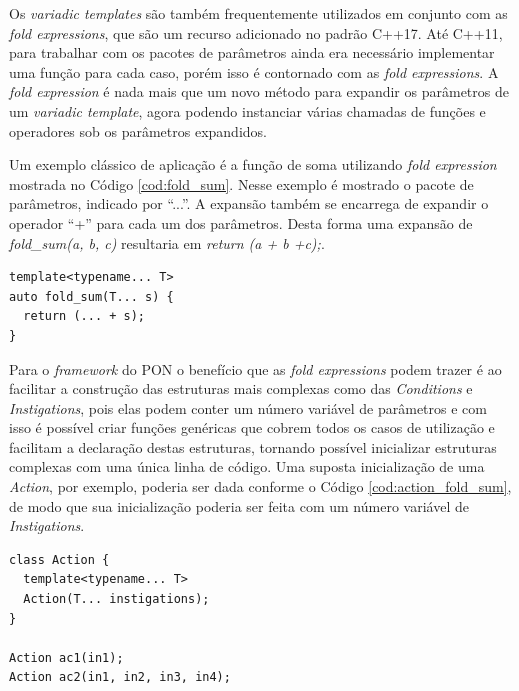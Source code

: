 Os \textit{variadic templates} são também frequentemente utilizados em conjunto
com as \textit{fold expressions}, que são um recurso adicionado no padrão C++17.
Até C++11, para trabalhar com os pacotes de parâmetros ainda era necessário
implementar uma função para cada caso, porém isso é contornado com as
\textit{fold expressions}. A \textit{fold expression} é nada mais que um novo
método para expandir os parâmetros de um \textit{variadic template}, agora
podendo instanciar várias chamadas de funções e operadores sob os parâmetros
expandidos.

Um exemplo clássico de aplicação é a função de soma utilizando \textit{fold
expression} mostrada no Código \ref{cod:fold_sum}. Nesse exemplo é mostrado o
pacote de parâmetros, indicado por \enquote{...}. A expansão também se encarrega
de expandir o operador \enquote{+} para cada um dos parâmetros. Desta forma uma
expansão de \textit{fold\_sum(a, b, c)} resultaria em \textit{return (a + b
+c);}.

\begin{lstlisting}[caption = {Uso de \textit{fold expressions}}, float=htb,
source = {Autoria própria},
label = {cod:fold_sum}]
template<typename... T>
auto fold_sum(T... s) {
  return (... + s);
}
\end{lstlisting}

\FloatBarrier

Para o \textit{framework} do PON o benefício que as \textit{fold expressions}
podem trazer é ao facilitar a construção das estruturas mais complexas como das
\textit{Conditions} e \textit{Instigations}, pois elas podem conter um número
variável de parâmetros e com isso é possível criar funções genéricas que cobrem
todos os casos de utilização e facilitam a declaração destas estruturas,
tornando possível inicializar estruturas complexas com uma única linha de
código. Uma suposta inicialização de uma \textit{Action}, por exemplo, poderia
ser dada conforme o Código \ref{cod:action_fold_sum}, de modo que sua
inicialização poderia ser feita com um número variável de \textit{Instigations}.

\begin{lstlisting}[caption = {\textit{Action} com \textit{fold expressions}}, float=htb,
  source = {Autoria própria},
label = {cod:action_fold_sum}]
class Action {
  template<typename... T>
  Action(T... instigations);
}

Action ac1(in1);
Action ac2(in1, in2, in3, in4);
\end{lstlisting}


